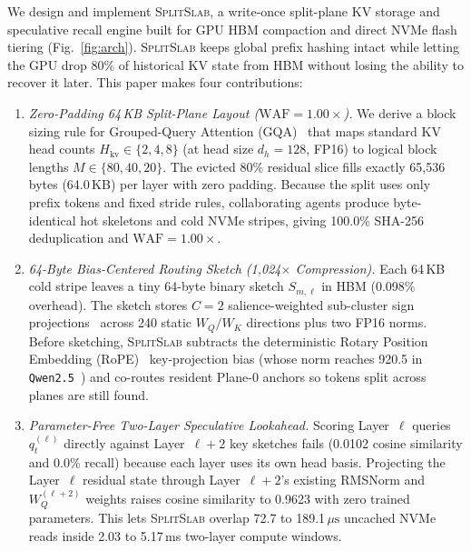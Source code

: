 \documentclass[pdflatex,sn-mathphys-num]{sn-jnl}
\theoremstyle{thmstyleone}
\newcommand{\SplitSlab}{\textsc{SplitSlab}}
\newcommand{\WAF}{\mathrm{WAF}}
\begin{document}
We design and implement \SplitSlab{}, a write-once split-plane KV storage and speculative recall engine built for GPU HBM compaction and direct NVMe flash tiering (Fig.~\ref{fig:arch}). \SplitSlab{} keeps global prefix hashing intact while letting the GPU drop 80\% of historical KV state from HBM without losing the ability to recover it later. This paper makes four contributions:

\begin{enumerate}
  \item \emph{Zero-Padding 64\,KB Split-Plane Layout ($\WAF = 1.00\times$).} We derive a block sizing rule for Grouped-Query Attention (GQA)~\cite{ainslie2023gqa} that maps standard KV head counts $H_{\mathrm{kv}} \in \{2, 4, 8\}$ (at head size $d_h = 128$, FP16) to logical block lengths $M \in \{80, 40, 20\}$. The evicted 80\% residual slice fills exactly 65,536 bytes (64.0\,KB) per layer with zero padding. Because the split uses only prefix tokens and fixed stride rules, collaborating agents produce byte-identical hot skeletons and cold NVMe stripes, giving 100.0\% SHA-256 deduplication and $\WAF = 1.00\times$.

  \item \emph{64-Byte Bias-Centered Routing Sketch (1,024$\times$ Compression).} Each 64\,KB cold stripe leaves a tiny 64-byte binary sketch $S_{m,\ell}$ in HBM (0.098\% overhead). The sketch stores $C=2$ salience-weighted sub-cluster sign projections~\cite{charikar2002simhash,gao2024rabitq} across 240 static $W_Q/W_K$ directions plus two FP16 norms. Before sketching, \SplitSlab{} subtracts the deterministic Rotary Position Embedding (RoPE)~\cite{su2024roformer} key-projection bias (whose norm reaches 920.5 in \texttt{Qwen2.5}~\cite{yang2024qwen25}) and co-routes resident Plane-0 anchors so tokens split across planes are still found.

  \item \emph{Parameter-Free Two-Layer Speculative Lookahead.} Scoring Layer~$\ell$ queries $q_t^{(\ell)}$ directly against Layer~$\ell+2$ key sketches fails (0.0102 cosine similarity and 0.0\% recall) because each layer uses its own head basis. Projecting the Layer~$\ell$ residual state through Layer~$\ell+2$'s existing RMSNorm and $W_Q^{(\ell+2)}$ weights raises cosine similarity to 0.9623 with zero trained parameters. This lets \SplitSlab{} overlap 72.7 to 189.1\,$\mu\mathrm{s}$ uncached NVMe reads inside 2.03 to 5.17\,ms two-layer compute windows.


\end{enumerate}
\end{document}
